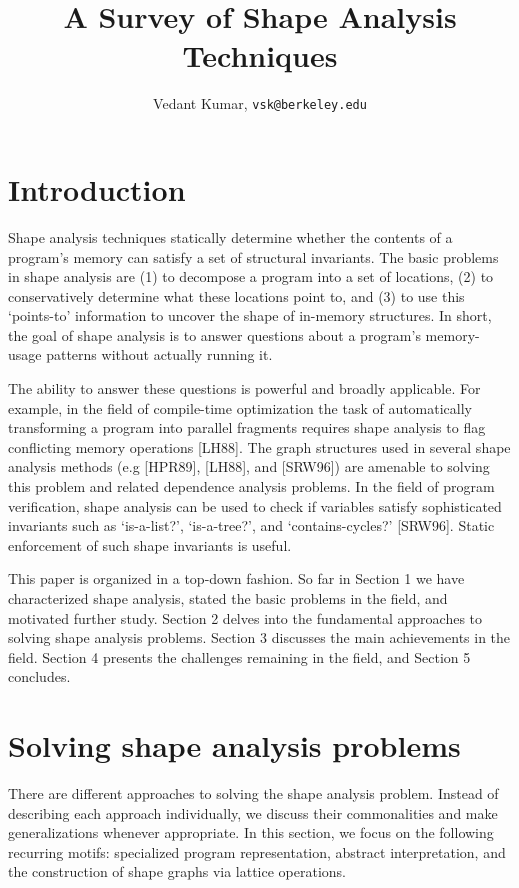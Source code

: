 \documentclass{article}
\title{A Survey of Shape Analysis Techniques}
\author{Vedant Kumar, \texttt{vsk@berkeley.edu}}
\begin{document}
\maketitle

\section{Introduction}

Shape analysis techniques statically determine whether the contents of a
program's memory can satisfy a set of structural invariants. The basic
problems in shape analysis are (1) to decompose a program into a set of
locations, (2) to conservatively determine what these locations point to,
and (3) to use this `points-to' information to uncover the shape of
in-memory structures. In short, the goal of shape analysis is to answer
questions about a program's memory-usage patterns without actually running
it.

The ability to answer these questions is powerful and broadly applicable.
For example, in the field of compile-time optimization the task of
automatically transforming a program into parallel fragments requires shape
analysis to flag conflicting memory operations [LH88]. The graph structures
used in several shape analysis methods (e.g [HPR89], [LH88], and [SRW96])
are amenable to solving this problem and related dependence analysis
problems. In the field of program verification, shape analysis can be used
to check if variables satisfy sophisticated invariants such as `is-a-list?',
`is-a-tree?', and `contains-cycles?' [SRW96]. Static enforcement of such
shape invariants is useful.

This paper is organized in a top-down fashion. So far in Section 1 we have
characterized shape analysis, stated the basic problems in the field, and
motivated further study. Section 2 delves into the fundamental approaches to
solving shape analysis problems. Section 3 discusses the main achievements
in the field. Section 4 presents the challenges remaining in the field, and
Section 5 concludes.

\section{Solving shape analysis problems}

There are different approaches to solving the shape analysis problem.
Instead of describing each approach individually, we discuss their
commonalities and make generalizations whenever appropriate. In this
section, we focus on the following recurring motifs: specialized program
representation, abstract interpretation, and the construction of shape
graphs via lattice operations.
\end{document}
